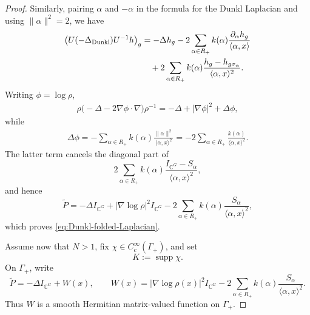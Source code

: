 \documentclass{amsart}
\begin{document}
\begin{proof}
Similarly, pairing \(\alpha\) and \(-\alpha\) in the formula for the
Dunkl Laplacian and using \(\|\alpha\|^2=2\), we have
\begin{align*}
\bigl(
U(-\Delta_{{\rm Dunkl}})U^{-1}h
\bigr)_g
&=
-\Delta h_g
-
2\sum_{\alpha\in R_+}
k(\alpha)
\frac{\partial_\alpha h_g}
{\langle\alpha,x\rangle}\\
&\quad+
2\sum_{\alpha\in R_+}
k(\alpha)
\frac{h_g-h_{g\sigma_\alpha}}
{\langle\alpha,x\rangle^2}.
\end{align*}
Writing \(\phi=\log\rho\),
\begin{align*}
\rho
\bigl(
-\Delta-2\nabla\phi\cdot\nabla
\bigr)
\rho^{-1}
=
-\Delta+|\nabla\phi|^2+\Delta\phi,
\end{align*}
while
\begin{align*}
\Delta\phi
=
-\sum_{\alpha\in R_+}
k(\alpha)
\frac{\|\alpha\|^2}{\langle\alpha,x\rangle^2}
=
-2\sum_{\alpha\in R_+}
\frac{k(\alpha)}{\langle\alpha,x\rangle^2}.
\end{align*}
The latter term cancels the diagonal part of
\[
2\sum_{\alpha\in R_+}
k(\alpha)
\frac{I_{\mathbb C^G}-S_\alpha}
{\langle\alpha,x\rangle^2},
\]
and hence
\[
\widetilde P
=
-\Delta I_{\mathbb C^G}
+
|\nabla\log\rho|^2I_{\mathbb C^G}
-
2\sum_{\alpha\in R_+}
k(\alpha)
\frac{S_\alpha}{\langle\alpha,x\rangle^2},
\]
which proves \eqref{eq:Dunkl-folded-Laplacian}.

Assume now that \(N>1\), fix
\(\chi\in C_c^\infty(\Gamma_+)\), and set
\[
K:=\operatorname{supp}\chi.
\]
On \(\Gamma_+\), write
\[
\widetilde P=-\Delta I_{\mathbb C^G}+W(x),
\qquad
W(x)
=
|\nabla\log\rho(x)|^2I_{\mathbb C^G}
-
2\sum_{\alpha\in R_+}
k(\alpha)
\frac{S_\alpha}{\langle\alpha,x\rangle^2}.
\]
Thus \(W\) is a smooth Hermitian matrix-valued function on
\(\Gamma_+\).


\end{proof}
\end{document}
